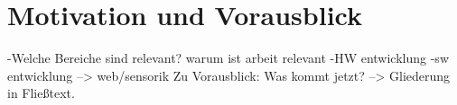 \section{Motivation und Vorausblick}
-Welche Bereiche sind relevant? warum ist arbeit relevant
	-HW entwicklung
	-sw entwicklung --> web/sensorik
Zu Vorausblick: Was kommt jetzt? --> Gliederung in Fließtext.
